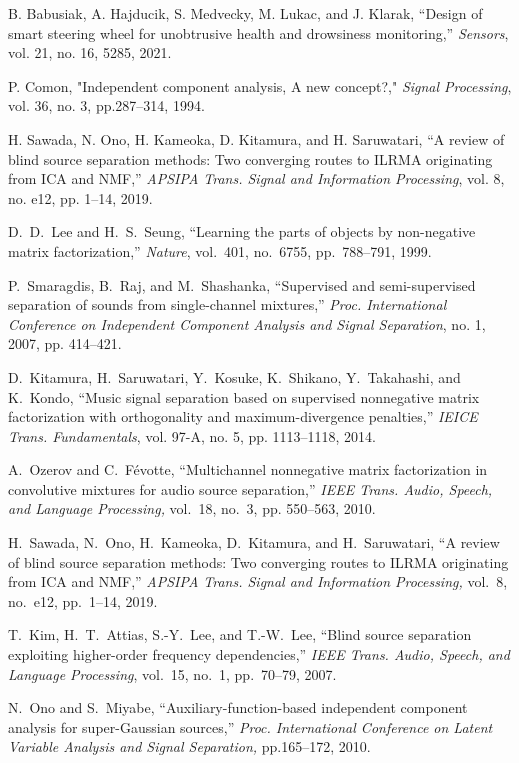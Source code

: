\documentclass[honka]{nitkagawathesis}%
\begin{document}
\begin{thebibliography}{99}
  B. Babusiak, A. Hajducik, S. Medvecky, M. Lukac, and J. Klarak, ``Design of smart steering wheel for unobtrusive health and drowsiness monitoring,'' {\em Sensors}, 
  vol. 21, no. 16, 5285, 2021.

  P. Comon, "Independent component analysis, A new concept?," {\em Signal Processing}, vol. 36, no. 3, pp.287--314, 1994.

  H. Sawada, N. Ono, H. Kameoka, D. Kitamura, and H. Saruwatari, ``A review of
  blind source separation methods: Two converging routes to ILRMA originating from
  ICA and NMF,'' {\em APSIPA Trans. Signal and Information Processing}, vol. 8, no. e12,
  pp. 1–14, 2019.

  D.~D.~Lee and H.~S.~Seung,
  ``Learning the parts of objects by non-negative matrix factorization,''
  {\em Nature}, vol.~401, no.~6755, pp.~788--791, 1999.
  
  P.~Smaragdis, B.~Raj, and M.~Shashanka, 
  ``Supervised and semi-supervised separation of sounds from single-channel mixtures,''  
  {\em Proc. International Conference on Independent Component Analysis and Signal Separation}, no. 1, 2007, pp. 414–421.
  
  D.~Kitamura, H.~Saruwatari, Y.~Kosuke, K.~Shikano, Y.~Takahashi, and K.~Kondo, 
  ``Music signal separation based on supervised nonnegative matrix factorization with orthogonality and maximum-divergence penalties,'' 
  {\em IEICE Trans. Fundamentals}, vol. 97-A, no. 5, pp. 1113–1118, 2014.
  
  A.~Ozerov and C.~Févotte,
  ``Multichannel nonnegative matrix factorization in convolutive mixtures for audio source separation,'' 
  {\em IEEE Trans. Audio, Speech, and Language Processing,} vol.~18, no.~3, pp. 550--563, 2010.
  
  H.~Sawada, N.~Ono, H.~Kameoka, D.~Kitamura, and H.~Saruwatari, ``A review of blind source separation methods: Two converging routes to ILRMA originating from ICA and NMF,'' 
  {\em APSIPA Trans. Signal and Information Processing,} vol.~8, no.~e12, pp.~1--14, 2019.

  T.~Kim, H.~T.~Attias, S.-Y.~Lee, and T.-W.~Lee, ``Blind source separation exploiting higher-order frequency dependencies,'' 
  {\em IEEE Trans. Audio, Speech, and Language Processing}, vol.~15, no.~1, pp.~70--79, 2007.

  N.~Ono and S.~Miyabe, ``Auxiliary-function-based independent component analysis for super-Gaussian sources,'' 
  {\em Proc. International Conference on Latent Variable Analysis and Signal Separation,} pp.165--172, 2010.
    

\end{thebibliography}
\end{document}
